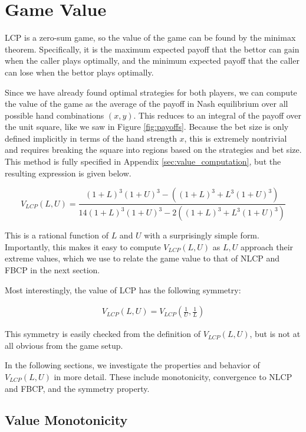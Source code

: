 \documentclass[../../main/main.tex]{subfiles}
\begin{document}
\section{Game Value}
\label{sec:game_value}

LCP is a zero-sum game, so the value of the game can be found by the minimax theorem. Specifically, it is the maximum expected payoff that the bettor can gain when the caller plays optimally, and the minimum expected payoff that the caller can lose when the bettor plays optimally.

Since we have already found optimal strategies for both players, we can compute the value of the game as the average of the payoff in Nash equilibrium over all possible hand combinations $(x, y)$. This reduces to an integral of the payoff over the unit square, like we saw in Figure \ref{fig:payoffs}. Because the bet size is only defined implicitly in terms of the hand strength $x$, this is extremely nontrivial and requires breaking the square into regions based on the strategies and bet size. This method is fully specified in Appendix \ref{sec:value_computation}, but the resulting expression is given below.

\[
    V_{LCP}(L, U) = \frac{(1 + L)^3(1+U)^3 - ((1+L)^3+L^3(1 + U)^3)}{14(1 + L)^3(1+U)^3 - 2((1+L)^3+L^3(1 + U)^3)}
\]

This is a rational function of $L$ and $U$ with a surprisingly simple form.  Importantly, this makes it easy to compute $V_{LCP}(L, U)$ as $L, U$ approach their extreme values, which we use to relate the game value to that of NLCP and FBCP in the next section. 

Most interestingly, the value of LCP has the following symmetry:

\begin{align*}
    V_{LCP}(L, U) = V_{LCP}\left(\frac{1}{U}, \frac{1}{L}\right)
\end{align*}

This symmetry is easily checked from the definition of $V_{LCP}(L, U)$, but is not at all obvious from the game setup.

In the following sections, we investigate the properties and behavior of $V_{LCP}(L, U)$ in more detail. These include monotonicity, convergence to NLCP and FBCP, and the symmetry property.





\subsection{Value Monotonicity}
\end{document}
